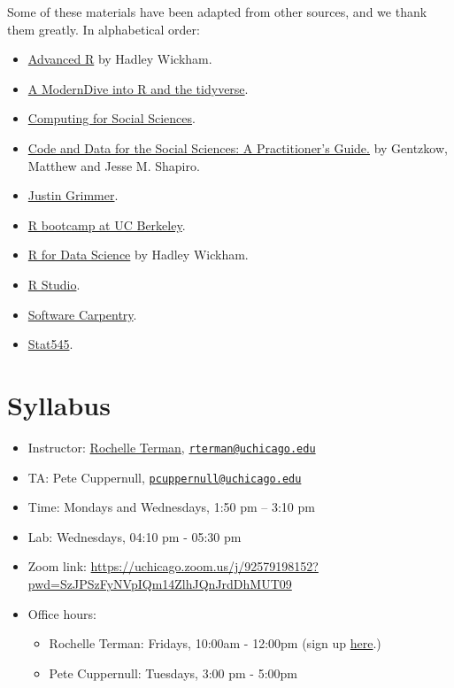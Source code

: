 \documentclass[
]{book}
\providecommand{\tightlist}{%
  \setlength{\itemsep}{0pt}\setlength{\parskip}{0pt}}
\begin{document}
Some of these materials have been adapted from other sources, and we thank them greatly. In alphabetical order:

\begin{itemize}
\tightlist
\item
  \href{https://adv-r.hadley.nz/}{Advanced R} by Hadley Wickham.
\item
  \href{https://moderndive.netlify.com/1-getting-started.html}{A ModernDive into R and the tidyverse}.
\item
  \href{https://cfss.uchicago.edu}{Computing for Social Sciences}.
\item
  \href{https://web.stanford.edu/~gentzkow/research/CodeAndData.pdf}{Code and Data for the Social Sciences: A Practitioner's Guide.} by Gentzkow, Matthew and Jesse M. Shapiro.
\item
  \href{https://www.justingrimmer.org/}{Justin Grimmer}.
\item
  \href{https://github.com/berkeley-scf/r-bootcamp-fall-2019}{R bootcamp at UC Berkeley}.
\item
  \href{https://r4ds.had.co.nz/}{R for Data Science} by Hadley Wickham.
\item
  \href{https://support.rstudio.com/hc/en-us/articles/200484448}{R Studio}.
\item
  \href{http://swcarpentry.github.io/r-novice-gapminder/}{Software Carpentry}.
\item
  \href{https://stat545.com/}{Stat545}.
\end{itemize}

\hypertarget{syllabus}{%
\chapter{Syllabus}\label{syllabus}}

\begin{itemize}
\item
  Instructor: \href{http://rochelleterman.com/}{Rochelle Terman}, \href{mailto:rterman@uchicago.edu}{\nolinkurl{rterman@uchicago.edu}}
\item
  TA: Pete Cuppernull, \href{mailto:pcuppernull@uchicago.edu}{\nolinkurl{pcuppernull@uchicago.edu}}
\item
  Time: Mondays and Wednesdays, 1:50 pm -- 3:10 pm
\item
  Lab: Wednesdays, 04:10 pm - 05:30 pm
\item
  Zoom link: \url{https://uchicago.zoom.us/j/92579198152?pwd=SzJPSzFyNVpIQm14ZlhJQnJrdDhMUT09}
\item
  Office hours:

  \begin{itemize}
  \tightlist
  \item
    Rochelle Terman: Fridays, 10:00am - 12:00pm (sign up \href{https://calendar.google.com/calendar/u/0/selfsched?sstoken=UU15RV92YzJrVDNDfGRlZmF1bHR8NjcyM2ZhMGM4ODIwMGIxYTZmYjdmZDE1NzhiOGM0OGI}{here}.)
  \item
    Pete Cuppernull: Tuesdays, 3:00 pm - 5:00pm
  \end{itemize}
\end{itemize}
\end{document}
